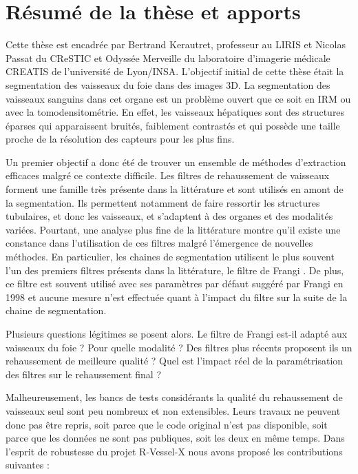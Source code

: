 \section{Résumé de la thèse et apports}
\label{sec:introduction:résumé}

Cette thèse est encadrée par Bertrand Kerautret, professeur au LIRIS et Nicolas Passat du CReSTIC et Odyssée Merveille du laboratoire d'imagerie médicale CREATIS de l'université de Lyon/INSA. L'objectif initial de cette thèse était la segmentation des vaisseaux du foie dans des images 3D. La segmentation des vaisseaux sanguins dans cet organe est un problème ouvert que ce soit en IRM ou avec la tomodensitométrie. En effet, les vaisseaux hépatiques sont des structures éparses qui apparaissent bruités, faiblement contrastés et qui possède une taille proche de la résolution des capteurs pour les plus fins.

Un premier objectif a donc été de trouver un ensemble de méthodes d'extraction efficaces malgré ce contexte difficile. Les filtres de rehaussement de vaisseaux forment une famille très présente dans la littérature et sont utilisés en amont de la segmentation. Ils permettent notamment de faire ressortir les structures tubulaires, et donc les vaisseaux, et s'adaptent à des organes et des modalités variées. Pourtant, une analyse plus fine de la littérature montre qu'il existe une constance dans l'utilisation de ces filtres malgré l'émergence de nouvelles méthodes. En particulier, les chaines de segmentation utilisent le plus souvent l'un des premiers filtres présents dans la littérature, le filtre de Frangi \cite{Frangi1998_vesselness}. De plus, ce filtre est souvent utilisé avec ses paramètres par défaut suggéré par Frangi en 1998 et aucune mesure n'est effectuée quant à l'impact du filtre sur la suite de la chaine de segmentation.

Plusieurs questions légitimes se posent alors. Le filtre de Frangi est-il adapté aux vaisseaux du foie ? Pour quelle modalité ? Des filtres plus récents proposent ils un rehaussement de meilleure qualité ? Quel est l'impact réel de la paramétrisation des filtres sur le rehaussement final ?

Malheureusement, les bancs de tests considérants la qualité du rehaussement de vaisseaux seul sont peu nombreux et non extensibles. Leurs travaux ne peuvent donc pas être repris, soit parce que le code original n'est pas disponible, soit parce que les données ne sont pas publiques, soit les deux en même temps. Dans l'esprit de robustesse du projet R-Vessel-X nous avons proposé les contributions suivantes :

